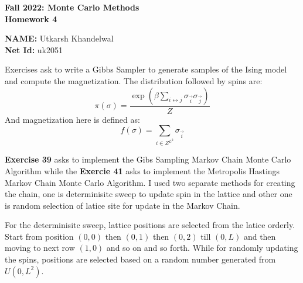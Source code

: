 \documentclass[11pt]{article}
\begin{document}
\begin{center}
\large \textbf{%
Fall 2022: Monte Carlo Methods}\\
\textbf{ Homework 4 }
\end{center}
\begin{center}
{\textbf{NAME:} Utkarsh Khandelwal\\}
{\textbf{Net Id:} uk2051}
\end{center}


\noindent Exercises ask to write a Gibbs Sampler to generate samples of the Ising model and compute the magnetization.
The distribution followed by spins are:
$$
\pi(\sigma) = \frac{ \exp{\left( \beta \sum_{{i \leftrightarrow j}} \sigma_{\overrightarrow{i}} \sigma_{\overrightarrow{j}}\right)} }     {Z}
$$
And magnetization here is defined as:
$$
f(\sigma) = \sum_{i \in Z^{L^2}} \sigma_{\overrightarrow{i}}
$$

\noindent \textbf{Exercise 39} asks to implement the Gibs Sampling Markov Chain Monte Carlo Algorithm while the \textbf{Exercie 41} asks to implement the Metropolis Hastings Markov Chain Monte Carlo Algorithm. I used two separate
methods for creating the chain, one is determinisitc sweep to update spin in the lattice and other one is random selection of latice site for update in the Markov Chain.

\begin{center}
\end{center}

\noindent For the determinisitc sweep, lattice positions are selected from the latice orderly. Start from position $(0,0)$ then $(0,1)$ then $(0,2)$ till $(0,L)$ and then moving to next row $(1,0)$ and so on and so forth. While for randomly updating the spins,
positions are selected based on a random number generated from $U(0, L^2)$. \\[12pt]
\par
\end{document}
